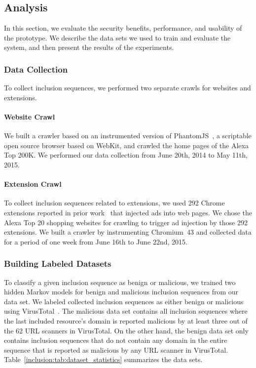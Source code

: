 \subsection{Analysis}
\label{inclusion:sec:analysis}

In this section, we evaluate the security benefits, performance, and usability
of the \excision prototype. We describe the data sets we used to train and
evaluate the system, and then present the results of the experiments.

\subsubsection{Data Collection}



To collect inclusion sequences, we performed two separate crawls for websites
and extensions.

\paragraph{Website Crawl}

We built a crawler based on an instrumented version of
PhantomJS~\cite{phantomjs}, a scriptable open source browser based on WebKit,
and crawled the home pages of the Alexa Top 200K. We performed our data
collection from June 20th, 2014 to May 11th, 2015.

\paragraph{Extension Crawl}

To collect inclusion sequences related to extensions, we used 292 Chrome
extensions reported in prior work~\cite{www2015adinjection} that injected ads
into web pages. We chose the Alexa Top 20 shopping websites for crawling to
trigger ad injection by those 292 extensions. We built a crawler by
instrumenting Chromium~43 and collected data for a period of one week from June
16th to June 22nd, 2015.

\subsubsection{Building Labeled Datasets}
\label{inclusion:sec:building-labelled-dataset}

To classify a given inclusion sequence as benign or malicious, we trained two
hidden Markov models for benign and malicious inclusion sequences from our data
set. We labeled collected inclusion sequences as either benign or malicious
using VirusTotal~\cite{virustotal}. The malicious data set contains all
inclusion sequences where the last included resource's domain is reported
malicious by at least three out of the 62 URL scanners in VirusTotal. On the
other hand, the benign data set only contains inclusion sequences that do not
contain any domain in the entire sequence that is reported as malicious by any
URL scanner in VirusTotal. Table~\ref{inclusion:tab:dataset_statistics}
summarizes the data sets.

